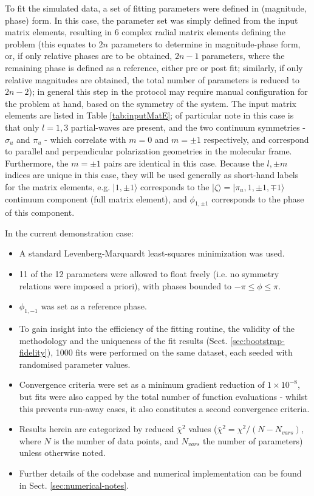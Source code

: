 \documentclass[10pt]{article}
\begin{document}
To fit the simulated data, a set of fitting parameters were defined in (magnitude, phase) form. In this case, the parameter set was simply defined from the input matrix elements, resulting in 6 complex radial matrix elements defining the problem (this equates to $2n$ parameters to determine in magnitude-phase form, or, if only relative phases are to be obtained, $2n-1$ parameters, where the remaining phase is defined as a reference, either pre or post fit; similarly, if only relative magnitudes are obtained, the total number of parameters is reduced to $2n-2$); in general this step in the protocol may require manual configuration for the problem at hand, based on the symmetry of the system. The input matrix elements are listed in Table \ref{tab:inputMatE}; of particular note in this case is that only $l=1,3$ partial-waves are present, and the two continuum symmetries - $\sigma_u$ and $\pi_u$ - which correlate with $m=0$ and $m=\pm1$ respectively, and correspond to parallel and perpendicular polarization geometries in the molecular frame. Furthermore, the $m=\pm1$ pairs are identical in this case. Because the $l,\pm m$ indices are unique in this case, they will be used generally as short-hand labels for the matrix elements, e.g. $|1,\pm1\rangle$ corresponds to the $|\zeta\rangle = |\pi_u,1,\pm 1,\mp 1 \rangle$ continuum component (full matrix element), and $\phi_{1,\pm1}$ corresponds to the phase of this component.

In the current demonstration case:

\begin{itemize}
\item A standard Levenberg-Marquardt least-squares minimization was used.
\item 11 of the 12 parameters were allowed to float freely (i.e. no symmetry relations were imposed a priori), with phases bounded to $-\pi\leq\phi\leq\pi$. %
\item $\phi_{1,-1}$ was set as a reference phase. 
\item To gain insight into the efficiency of the fitting routine, the validity of the methodology and the uniqueness of the fit results (Sect. \ref{sec:bootstrap-fidelity}), 1000 fits were performed on the same dataset, each seeded with randomised parameter values. 
\item Convergence criteria were set as a minimum gradient reduction of $1\times10^{-8}$, %
but fits were also capped by the total number of function evaluations - whilst this prevents run-away cases, it also constitutes a second convergence criteria.
\item Results herein are categorized by reduced $\bar{\chi}^2$ values ($\bar{\chi}^2=\chi^2/(N-N_{vars})$, where $N$ is the number of data points, and $N_{vars}$ the number of parameters) unless otherwise noted.
\item Further details of the codebase and numerical implementation can be found in Sect. \ref{sec:numerical-notes}.
\end{itemize}
\end{document}
